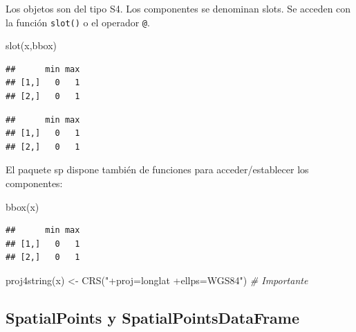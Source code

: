 \documentclass[
  spanish,
]{book}
\newenvironment{Shaded}{\begin{snugshade}}{\end{snugshade}}
\newcommand{\CommentTok}[1]{\textcolor[rgb]{0.56,0.35,0.01}{\textit{#1}}}
\newcommand{\DocumentationTok}[1]{\textcolor[rgb]{0.56,0.35,0.01}{\textbf{\textit{#1}}}}
\newcommand{\FunctionTok}[1]{\textcolor[rgb]{0.00,0.00,0.00}{#1}}
\newcommand{\NormalTok}[1]{#1}
\newcommand{\OtherTok}[1]{\textcolor[rgb]{0.56,0.35,0.01}{#1}}
\newcommand{\SpecialCharTok}[1]{\textcolor[rgb]{0.00,0.00,0.00}{#1}}
\newcommand{\StringTok}[1]{\textcolor[rgb]{0.31,0.60,0.02}{#1}}
\theoremstyle{break}
\begin{document}
Los objetos son del tipo S4.
Los componentes se denominan slots.
Se acceden con la función \texttt{slot()} o el operador \texttt{@}.

\begin{Shaded}
\begin{Highlighting}[]
\FunctionTok{slot}\NormalTok{(x,}\StringTok{\textquotesingle{}bbox\textquotesingle{}}\NormalTok{)}
\end{Highlighting}
\end{Shaded}

\begin{verbatim}
##      min max
## [1,]   0   1
## [2,]   0   1
\end{verbatim}

\begin{Shaded}
\end{Shaded}

\begin{verbatim}
##      min max
## [1,]   0   1
## [2,]   0   1
\end{verbatim}

El paquete sp dispone también de funciones para acceder/establecer
los componentes:

\begin{Shaded}
\begin{Highlighting}[]
\FunctionTok{bbox}\NormalTok{(x)}
\end{Highlighting}
\end{Shaded}

\begin{verbatim}
##      min max
## [1,]   0   1
## [2,]   0   1
\end{verbatim}

\begin{Shaded}
\begin{Highlighting}[]
\FunctionTok{proj4string}\NormalTok{(x) }\OtherTok{\textless{}{-}} \FunctionTok{CRS}\NormalTok{(}\StringTok{"+proj=longlat +ellps=WGS84"}\NormalTok{) }\CommentTok{\# Importante}
\end{Highlighting}
\end{Shaded}

\hypertarget{spatialpoints-y-spatialpointsdataframe}{%
\subsection{SpatialPoints y SpatialPointsDataFrame}\label{spatialpoints-y-spatialpointsdataframe}}
\end{document}
